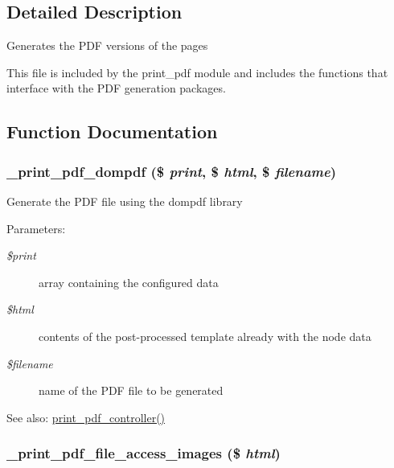 \subsection{Detailed Description}
Generates the PDF versions of the pages

This file is included by the print\_\-pdf module and includes the functions that interface with the PDF generation packages. 

\subsection{Function Documentation}
\hypertarget{print__pdf_8pages_8inc_1f00c18b79a7115894bd9495c887ea72}{
\subsubsection[{\_\-print\_\-pdf\_\-dompdf}]{\setlength{\rightskip}{0pt plus 5cm}\_\-print\_\-pdf\_\-dompdf (\$ {\em print}, \/  \$ {\em html}, \/  \$ {\em filename})}}
\label{print__pdf_8pages_8inc_1f00c18b79a7115894bd9495c887ea72}


Generate the PDF file using the dompdf library

\begin{Desc}
\item[Parameters:]
\begin{description}
\item[{\em \$print}]array containing the configured data \item[{\em \$html}]contents of the post-processed template already with the node data \item[{\em \$filename}]name of the PDF file to be generated \end{description}
\end{Desc}
\begin{Desc}
\item[See also:]\hyperlink{print__pdf_8pages_8inc_d2eb4e782095c48cf019319afa8fab06}{print\_\-pdf\_\-controller()} \end{Desc}
\hypertarget{print__pdf_8pages_8inc_bf0b6ad50624c030f81f2bfe43c753e6}{
\subsubsection[{\_\-print\_\-pdf\_\-file\_\-access\_\-images}]{\setlength{\rightskip}{0pt plus 5cm}\_\-print\_\-pdf\_\-file\_\-access\_\-images (\$ {\em html})}}
\label{print__pdf_8pages_8inc_bf0b6ad50624c030f81f2bfe43c753e6}


